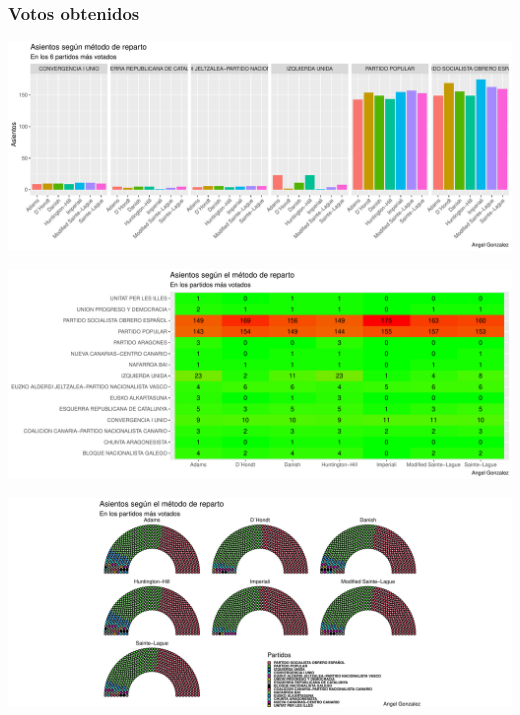 \documentclass[12pt,a4paper,]{book}
\numberwithin{dummy}{section}
\theoremstyle{ocrenumbox}
\theoremstyle{blacknumex}
\theoremstyle{blacknumbox}
\theoremstyle{ocrenum}
\theoremstyle{ocrenum}
\begin{document}
\hypertarget{votos-obtenidos-9}{%
\subsubsection{Votos obtenidos}\label{votos-obtenidos-9}}

\begin{center}\includegraphics[width=0.95\linewidth]{figurasR/unnamed-chunk-140-1} \end{center}

\begin{center}\includegraphics[width=0.95\linewidth]{figurasR/unnamed-chunk-140-2} \end{center}

\begin{center}\includegraphics[width=0.95\linewidth]{figurasR/unnamed-chunk-140-3} \end{center}
\end{document}
